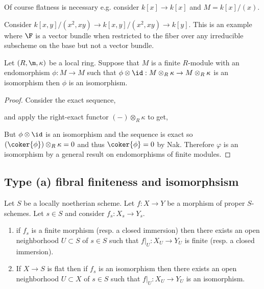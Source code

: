 \documentclass[12pt]{article}
\begin{document}
\begin{rmk}
Of course flatness is necessary e.g. consider $k[x] \to k[x]$ and $M = k[x]/(x)$.
\end{rmk}

\begin{rmk}
Consider $k[x,y]/(x^2, xy) \to k[x,y]/(x^2, xy) \to k[y]$. This is an example where $\F$ is a vector bundle when restricted to the fiber over any irreducible subscheme on the base but not a vector bundle.
\end{rmk}


\begin{lemma} \label{lemma:endo_local_ring}
Let $(R, \m, \kappa)$ be a local ring. Suppose that $M$ is a finite $R$-module with an endomorphism $\phi : M \to M$ such that $\phi \otimes \id : M \otimes_R \kappa \to M \otimes_R \kappa$ is an isomorphism then $\phi$ is an isomorphism. 
\end{lemma}

\begin{proof}
Consider the exact sequence,
\begin{center}
\end{center}
and apply the right-exact functor $(-) \otimes_R \kappa$ to get,
\begin{center}
\end{center}
But $\phi \otimes \id$ is an isomorphism and the sequence is exact so $(\coker{\phi}) \otimes_R \kappa = 0$ and thus $\coker{\phi} = 0$ by Nak. Therefore $\varphi$ is an isomorphism by a general result on endomorphisms of finite modules.
\end{proof}

\subsection{Type (a) fibral finiteness and isomorphsism}

\begin{prop}
Let $S$ be a locally noetherian scheme. Let $f : X \to Y$ be a morphism of proper $S$-schemes. Let $s \in S$ and consider $f_s : X_s \to Y_s$. 
\begin{enumerate}
\item if $f_s$ is a finite morphism (resp. a closed immersion) then there exists an open neighborhood $U \subset S$ of $s \in S$ such that $f|_U : X_U \to Y_U$ is finite (resp. a closed immersion).
\item If $X \to S$ is flat then if $f_s$ is an isomorphism then there exists an open neighborhood $U \subset X$ of $s \in S$ such that $f|_U : X_U \to Y_U$ is an isomorphism.
\end{enumerate}
\end{prop}
\end{document}
